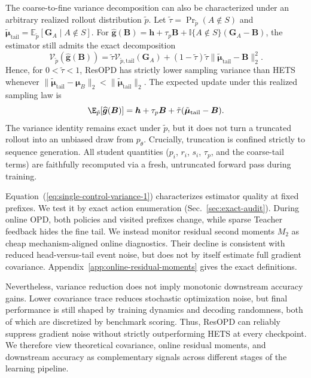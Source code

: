 The coarse-to-fine variance decomposition can also be characterized
under an arbitrary realized rollout distribution $\tilde p$. Let
$\tilde{\tau}=\Pr_{\tilde p}(A\notin S)$ and
$\tilde{\bm\mu}_{\mathrm{tail}}
=\mathbb{E}_{\tilde p}[\bm G_A\mid A\notin S]$.
For
$\hat{\bm g}(\bm B)=\bm h+\tau_p\bm B+
\mathbb{I}\{A\notin S\}(\bm G_A-\bm B)$,
the estimator still admits the exact decomposition
\begin{equation}
\mathcal V_{\tilde p}(\hat{\bm g}(\bm B))
=
\tilde{\tau}\mathcal V_{\tilde p,\mathrm{tail}}(\bm G_A)
+
(1-\tilde{\tau})\tilde{\tau}
\|\tilde{\bm\mu}_{\mathrm{tail}}-\bm B\|_2^2 .
\label{eq:realized-rollout-variance}
\end{equation}
Hence, for $0<\tilde{\tau}<1$, ResOPD has strictly lower sampling variance than HETS
whenever
$\|\tilde{\bm\mu}_{\mathrm{tail}}-\bm\mu_B\|_2
<\|\tilde{\bm\mu}_{\mathrm{tail}}\|_2$.
The expected update under this realized sampling law is
\begin{equation}
 \E_{\tilde p}[\widehat{\bgrad}(\bm B)]
 =\bhead+\tau_p\bm B
  +\tilde\tau(\tilde{\bm\mu}_{\mathrm{tail}}-\bm B).
 \label{eq:realized-rollout-mean}
\end{equation}
The variance identity remains exact under $\tilde p$, but it does not turn a
truncated rollout into an unbiased draw from $p_\theta$.
Crucially, truncation is confined strictly to sequence generation. All student quantities ($p_i$, $r_i$, $s_i$, $\tau_p$, and the coarse-tail terms) are faithfully recomputed via a fresh, untruncated forward pass during training.

Equation~(\ref{eq:single-control-variance-1}) characterizes estimator quality
at fixed prefixes. We test it by exact action enumeration
(Sec.~\ref{sec:exact-audit}). During online OPD, both policies and visited
prefixes change, while sparse Teacher feedback hides the fine tail.
We instead monitor residual second moments \(M_2\) as cheap mechanism-aligned online diagnostics. Their decline is consistent with reduced head-versus-tail event noise, but does not by itself estimate full gradient covariance.
Appendix~\ref{app:online-residual-moments} gives the exact definitions.

Nevertheless, variance reduction does not imply monotonic downstream accuracy gains. Lower covariance trace reduces stochastic optimization noise, but final performance is still shaped by training dynamics and decoding randomness, both of which are discretized by benchmark scoring. Thus, ResOPD can reliably suppress gradient noise without strictly outperforming HETS at every checkpoint. We therefore view theoretical covariance, online residual moments, and downstream accuracy as complementary signals across different stages of the learning pipeline.
